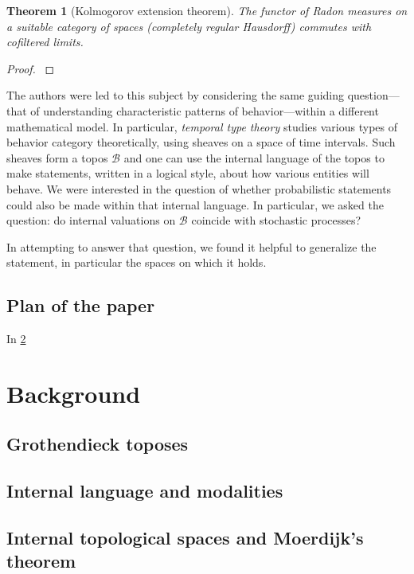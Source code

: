 \documentclass[11pt, oneside, article]{memoir}
\theoremstyle{plain}
\newtheorem{theorem}{Theorem}[chapter] %
\theoremstyle{definition}
\theoremstyle{remark}
\newcommand{\cat}[1]{\mathcal{#1}}
\begin{document}
\begin{theorem}[Kolmogorov extension theorem]
The functor of Radon measures on a suitable category of spaces (completely regular Hausdorff) commutes with cofiltered limits.
\end{theorem}
\begin{proof}
\cite[Theorem 2.5]{danos2015dirichlet}
\end{proof}

The authors were led to this subject by considering the same guiding question---that of understanding characteristic patterns of behavior---within a different mathematical model. In particular, \emph{temporal type theory} \cite{schultz2019temporal} studies various types of behavior category theoretically, using sheaves on a space of time intervals. Such sheaves form a topos $\cat{B}$ and one can use the internal language of the topos to make statements, written in a logical style, about how various entities will behave. We were interested in the question of whether probabilistic statements could also be made within that internal language. In particular, we asked the question: do internal valuations on $\cat{B}$ coincide with stochastic processes?

In attempting to answer that question, we found it helpful to generalize the statement, in particular the spaces on which it holds. 

\section{Plan of the paper}
In \cref{chap.background}


\chapter{Background}\label{chap.background}

\section{Grothendieck toposes}

\section{Internal language and modalities}

\section{Internal topological spaces and Moerdijk's theorem}
\end{document}
